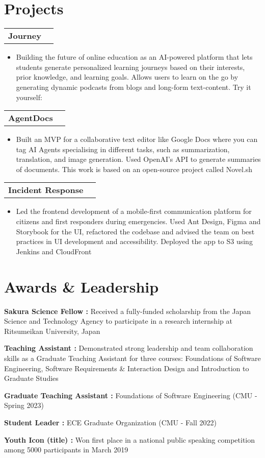 \documentclass[letterpaper]{article}
\makeatletter
\newcommand{\resumeItemWithoutTitle}[1]{
  \item\small{
    {#1 \vspace{0pt}}
  }
}
\newcommand{\shortSection}[1]{
    \vspace{-6pt}
    \section{#1}
}
\newcommand{\projectHeading}[1]{
  \begin{tabular*}{\textwidth}{l@{\extracolsep{\fill}}r}
        \textbf{#1}
    \end{tabular*}\vspace{0pt}
}
\newcommand*{\skill}[2]{
  \textbf{#1 : }#2 \\
  \vspace{1pt}
}
\newcommand{\resumeItemListStart}{\begin{itemize}}
\newcommand{\resumeItemListEnd}{\end{itemize}}
\makeatother
\begin{document}

\shortSection{Projects}
\vspace{3pt}
\projectHeading {Journey}
\resumeItemListStart
\resumeItemWithoutTitle{Building the future of online education as an AI-powered platform that lets students generate personalized learning journeys based on their interests, prior knowledge, and learning goals. Allows users to learn on the go by generating dynamic podcasts from blogs and long-form text-content. Try it yourself: \href{https://getjourney.app/home}{\color{blue}{getjourney.app}}}
\resumeItemListEnd


\vspace{3pt}
\projectHeading {AgentDocs}
\resumeItemListStart
\resumeItemWithoutTitle{Built an MVP for a collaborative text editor like Google Docs where you can tag AI Agents specialising in different tasks, such as summarization, translation, and image generation. Used OpenAI's API to generate summaries of documents. This work is based on an open-source project called Novel.sh}
\resumeItemListEnd


\vspace{3pt}
\projectHeading {Incident Response}
\resumeItemListStart
\resumeItemWithoutTitle{Led the frontend development of a mobile-first communication platform for citizens and first responders during emergencies. Used Ant Design, Figma and Storybook for the UI, refactored the codebase and advised the team on best practices in UI development and accessibility. Deployed the app to S3 using Jenkins and CloudFront}
\resumeItemListEnd


\shortSection{Awards \& Leadership}
\skill{Sakura Science Fellow}{Received a fully-funded scholarship from the Japan Science and Technology Agency to participate in a research internship at Ritsumeikan University, Japan}
\skill{Teaching Assistant}{Demonstrated strong leadership and team collaboration skills as a Graduate Teaching Assistant for three courses: Foundations of Software Engineering, Software Requirements \& Interaction Design and Introduction to Graduate Studies}
\skill{Graduate Teaching Assistant}{Foundations of Software Engineering (CMU - Spring 2023)}
\skill{Student Leader}{ECE Graduate Organization (CMU - Fall 2022)}
\skill{Youth Icon (title)}{Won first place in a national public speaking competition among 5000 participants in March 2019}
\end{document}
